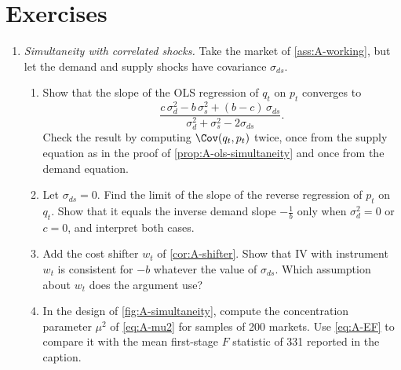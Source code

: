 \section{Exercises}\label{sec:A-exercises}

\begin{enumerate}[label=\arabic*., leftmargin=*, itemsep=6pt]

\item \textit{Simultaneity with correlated shocks.} Take the market of \cref{ass:A-working}, but let the demand and
supply shocks have covariance $\sigma_{ds}$.
\begin{enumerate}[label=(\alph*)]
  \item Show that the slope of the OLS regression of $q_t$ on $p_t$ converges to
  \begin{equation*}
  \frac{c\,\sigma_d^2 - b\,\sigma_s^2 + (b - c)\,\sigma_{ds}}{\sigma_d^2 + \sigma_s^2 - 2\sigma_{ds}} .
  \end{equation*}
  Check the result by computing $\Cov(q_t, p_t)$ twice, once from the supply equation as in the proof of
  \cref{prop:A-ols-simultaneity} and once from the demand equation.
  \item Let $\sigma_{ds} = 0$. Find the limit of the slope of the reverse regression of $p_t$ on $q_t$. Show that it
  equals the inverse demand slope $-\frac{1}{b}$ only when $\sigma_d^2 = 0$ or $c = 0$, and interpret both cases.
  \item Add the cost shifter $w_t$ of \cref{cor:A-shifter}. Show that IV with instrument $w_t$ is consistent for $-b$
  whatever the value of $\sigma_{ds}$. Which assumption about $w_t$ does the argument use?
  \item In the design of \cref{fig:A-simultaneity}, compute the concentration parameter $\mu^2$ of \eqref{eq:A-mu2}
  for samples of 200 markets. Use \eqref{eq:A-EF} to compare it with the mean first-stage $F$ statistic of 331 reported
  in the caption.
\end{enumerate}


\end{enumerate}
